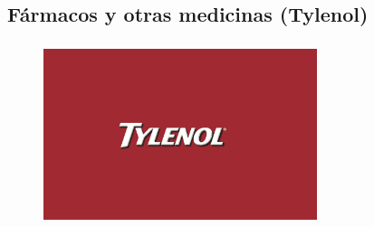 \documentclass[compress, aspectratio=169]{beamer} %
\begin{document}
	\subsection{Fármacos y otras medicinas (Tylenol)}
		\begin{frame}
	\transdissolve[duration=1]

			\frametitle{\insertsubsection}
			
			\begin{figure}
				\center\includegraphics[width=8cm]{tylenol.jpeg}
			\end{figure}
			
			
		\end{frame}
	
\end{document}
